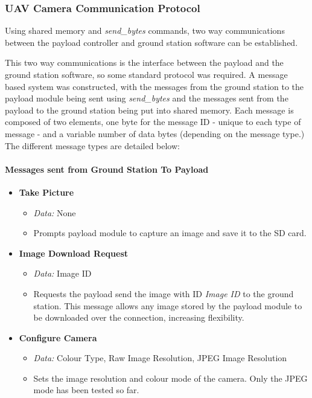 \subsubsection{UAV Camera Communication Protocol}
Using shared memory and \emph{send\_bytes} commands, two way 
communications between the payload controller and ground station software 
can be established.

This two way communications is the interface between the payload and the 
ground station software, so some standard protocol was required. A message 
based system was constructed, with the messages from the ground station to
the payload module being sent using \emph{send\_bytes} and the messages sent
from the payload to the ground station being put into shared memory. Each
message is composed of two elements, one byte for the message ID -
unique to each type of message - and a variable number of data bytes 
(depending on the message type.) The different message types are detailed 
below:

\paragraph{Messages sent from Ground Station To Payload}

\begin{itemize}
\item \textbf{Take Picture}
\begin{itemize}
\item \emph{Data:} None
\item Prompts payload module to capture an image and save it to the SD card.
\end{itemize}

\item \textbf{Image Download Request} 
\begin{itemize}

\item \emph{Data:} Image ID
\item Requests the payload send the image with ID \emph{Image ID} to the 
ground station. This message allows any image stored by the payload module 
to be downloaded over the connection, increasing flexibility. 
\end{itemize}

\item \textbf{Configure Camera}
\begin{itemize}
\item \emph{Data:} Colour Type, Raw Image Resolution, JPEG Image
Resolution
\item Sets the image resolution and colour mode of the camera. Only the 
JPEG mode has been tested so far.
\end{itemize}

\end{itemize}

